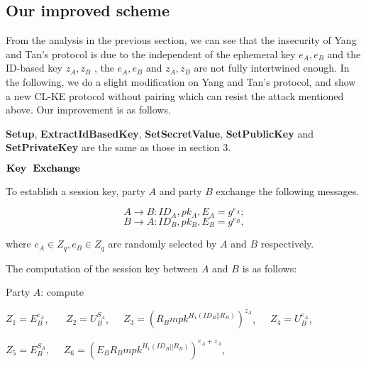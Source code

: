 \documentclass[final,1p,times,twocolumn]{elsarticle}
\begin{document}
\subsection{Our improved scheme}
\label{4.2}

  \vspace{0.1cm}

 From the analysis in the previous section, we can see that the insecurity of Yang and Tan's protocol is due to the independent of the ephemeral key $e_{A},e_{B}$ and the ID-based key $z_{A},z_{B}$ , the $e_{A},e_{B}$ and $z_{A},z_{B}$ are not fully intertwined enough. In the following, we do a slight modification on Yang and Tan's protocol, and show a new CL-KE protocol without pairing which can resist the attack mentioned above. Our improvement is as follows.

{\bf Setup}, {\bf ExtractIdBasedKey}, {\bf SetSecretValue}, {\bf SetPublicKey} and {\bf SetPrivateKey} are the same as those in section 3.

 \vspace{0.1cm}

\noindent$\displaystyle {\bf Key\ \ Exchange} $

 \vspace{0.1cm}

To establish a session key, party $A$ and party $B$ exchange the following messages.

\vspace{0.1cm}

$$A\rightarrow B: ID_{A},pk_{A},E_{A}=g^{e_{A}};$$
$$B\rightarrow A: ID_{B},pk_{B},E_{B}=g^{e_{B}},$$

\vspace{0.1cm}

where $e_{A}\in Z_{q},e_{B}\in Z_{q}$ are randomly selected by $A$ and $B$ respectively.

The computation of the session key between $A$ and $B$ is as follows:

Party $A$: compute

\vspace{0.1cm}

$Z_{1}=E_{B}^{e_{A}}$, \ \ \ $Z_{2}=U_{B}^{S_{A}}$,\ \ \ $Z_{3}=(R_{B}mpk^{H_{1}(ID_{B}||R_{B})})^{z_{A}}$,\ \ \ $Z_{4}=U_{B}^{e_{A}}$,

\vspace{0.1cm}

$Z_{5}=E_{B}^{S_{A}}$,\ \ \  $Z_{6}=(E_{B}R_{B}mpk^{H_{1}(ID_{B}||R_{B})})^{e_{A}+z_{A}}$,\ \ \ \

\vspace{0.1cm}
\end{document}
